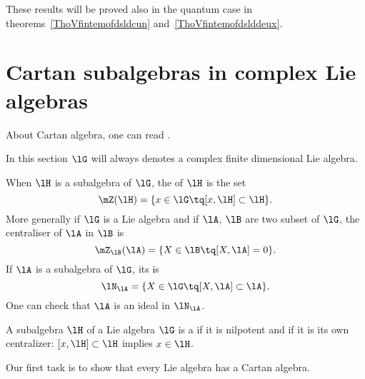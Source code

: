 These results will be proved also in the quantum case in theorems~\ref{ThoVfintemofdsldcun} and~\ref{ThoVfintemofdslddeux}.

\section{Cartan subalgebras in complex Lie algebras}
\label{SecCartaninComplex}
About Cartan algebra, one can read \cite{Dragan,Berndt,Hochschild,SamelsonNotesLieAlg}.

In this section $\lG$ will always denotes a complex finite dimensional Lie algebra.

\begin{definition}\label{PgDefCentralisateur}
    When \( \lH\) is a subalgebra of \( \lG\), the  of \( \lH\) is the set
    \begin{equation}
        \mZ(\lH)=\{x\in\lG\tq [x,\lH]\subset\lH\}.
    \end{equation}
    More generally if $\lG$ is a Lie algebra and if $\lA$, $\lB$ are two subset of $\lG$, the centraliser of $\lA$ in $\lB$ is
    \begin{equation}
        \mZ_{\lB}(\lA)=\{X\in\lB\tq [X,\lA]=0\}.
    \end{equation}
    If $\lA$ is a subalgebra of $\lG$, its  is
    \begin{equation}
        \lN_{\lA}=\{X\in\lG\tq [X,\lA]\subset\lA\}.
    \end{equation}
    One can check that $\lA$ is an ideal in $\lN_{\lA}$.
\end{definition}

\begin{definition}
A subalgebra $\lH$ of a Lie algebra $\lG$ is a  if it is nilpotent and if it is its own centralizer: $[x,\lH]\subset\lH$ implies $x\in\lH$.
\end{definition}

Our first task is to show that every Lie algebra has a Cartan algebra.

